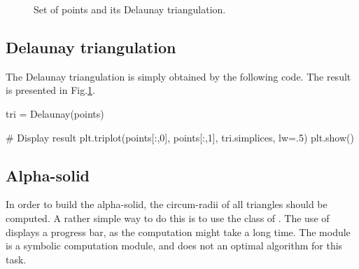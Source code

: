 \begin{figure}[htbp]
 \centering 
 \hfill
 \caption{Set of points and its Delaunay triangulation.}
 \label{fig:alphashape:python:points}
\end{figure}



\subsection{Delaunay triangulation}
The Delaunay triangulation is simply obtained by the following code. The result is presented in Fig.\ref{fig:alphashape:python:points}. 
\begin{python}
tri = Delaunay(points)

# Display result
plt.triplot(points[:,0], points[:,1], tri.simplices, lw=.5)
plt.show()
\end{python}


\subsection{Alpha-solid}
In order to build the alpha-solid, the circum-radii of all triangles should be computed. A rather simple way to do this is to use the class  of . The use of  displays a progress bar, as the computation might take a long time. The  module is a symbolic computation module, and does not an optimal algorithm for this task.

